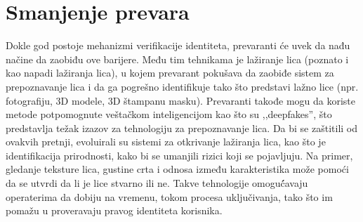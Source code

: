 \documentclass[a4paper]{article}
\begin{document}
\section{Smanjenje prevara}
\label{sec:smanjenje prevara}
Dokle god postoje mehanizmi verifikacije identiteta, prevaranti će uvek da nađu načine da zaobiđu ove barijere. Među tim tehnikama je lažiranje lica (poznato i kao napadi lažiranja lica), u kojem prevarant pokušava da zaobiđe sistem za prepoznavanje lica i da ga pogrešno identifikuje tako što predstavi lažno lice (npr. fotografiju, 3D modele, 3D štampanu masku). Prevaranti takođe mogu da koriste metode potpomognute veštačkom inteligencijom kao što su ,,deepfakes”, što predstavlja težak izazov za tehnologiju za prepoznavanje lica.\cite{ht20810823} 
Da bi se zaštitili od ovakvih pretnji, evoluirali su sistemi za otkrivanje lažiranja lica, kao što je identifikacija prirodnosti, kako bi se umanjili rizici koji se pojavljuju. Na primer, gledanje teksture lica, gustine crta i odnosa između karakteristika može pomoći da se utvrdi da li je lice stvarno ili ne. Takve tehnologije omoguć́avaju operaterima da dobiju na vremenu, tokom procesa uključivanja, tako što im pomažu u proveravaju pravog identiteta korisnika.
\newpage
\end{document}
